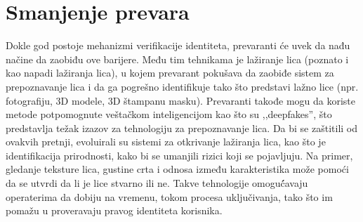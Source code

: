 \documentclass[a4paper]{article}
\begin{document}
\section{Smanjenje prevara}
\label{sec:smanjenje prevara}
Dokle god postoje mehanizmi verifikacije identiteta, prevaranti će uvek da nađu načine da zaobiđu ove barijere. Među tim tehnikama je lažiranje lica (poznato i kao napadi lažiranja lica), u kojem prevarant pokušava da zaobiđe sistem za prepoznavanje lica i da ga pogrešno identifikuje tako što predstavi lažno lice (npr. fotografiju, 3D modele, 3D štampanu masku). Prevaranti takođe mogu da koriste metode potpomognute veštačkom inteligencijom kao što su ,,deepfakes”, što predstavlja težak izazov za tehnologiju za prepoznavanje lica.\cite{ht20810823} 
Da bi se zaštitili od ovakvih pretnji, evoluirali su sistemi za otkrivanje lažiranja lica, kao što je identifikacija prirodnosti, kako bi se umanjili rizici koji se pojavljuju. Na primer, gledanje teksture lica, gustine crta i odnosa između karakteristika može pomoći da se utvrdi da li je lice stvarno ili ne. Takve tehnologije omoguć́avaju operaterima da dobiju na vremenu, tokom procesa uključivanja, tako što im pomažu u proveravaju pravog identiteta korisnika.
\newpage
\end{document}
